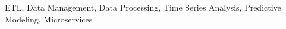 \begin{experiences}
{\begin{itemize}
                      \end{itemize}
                    }
                    {ETL, Data Management, Data Processing, Time Series Analysis, Predictive Modeling, Microservices}
  \emptySeparator
                        
                    
\end{experiences}
